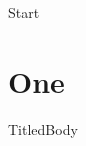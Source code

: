 \documentclass[aspectratio=169]{beamer}
\begin{document}
\begin{frame}[plain]Start\end{frame}
\section{One}
\begin{frame}{Titled}Body\end{frame}
\end{document}
